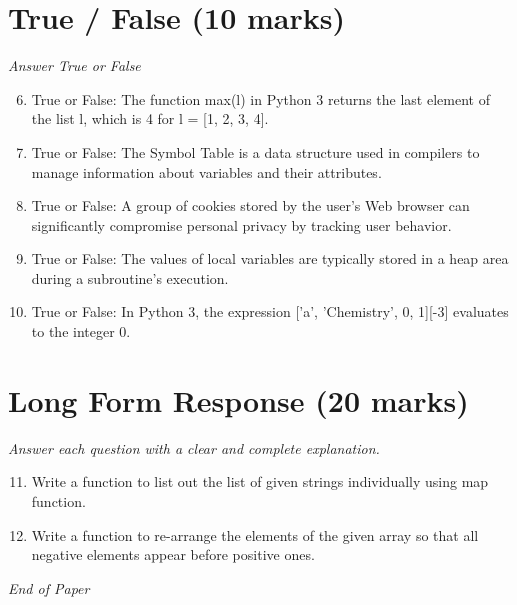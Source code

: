 \documentclass[12pt]{article}
\begin{document}
\section*{True / False (10 marks)}
\textit{Answer True or False}
\begin{enumerate}[label=\arabic*.]
\setcounter{enumi}{5}
\item True or False: The function max(l) in Python 3 returns the last element of the list l, which is 4 for l = [1, 2, 3, 4].
\item True or False: The Symbol Table is a data structure used in compilers to manage information about variables and their attributes.
\item True or False: A group of cookies stored by the user's Web browser can significantly compromise personal privacy by tracking user behavior.
\item True or False: The values of local variables are typically stored in a heap area during a subroutine's execution.
\item True or False: In Python 3, the expression ['a', 'Chemistry', 0, 1][-3] evaluates to the integer 0.
\end{enumerate}

\section*{Long Form Response (20 marks)}
\textit{Answer each question with a clear and complete explanation.}
\begin{enumerate}[label=\arabic*.]
\setcounter{enumi}{10}
\item Write a function to list out the list of given strings individually using map function.
\item Write a function to re-arrange the elements of the given array so that all negative elements appear before positive ones.
\end{enumerate}

\vfill
\noindent\textit{End of Paper}
\end{document}
